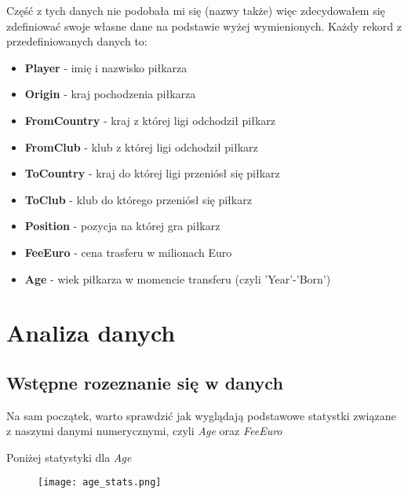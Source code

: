 \documentclass{article}
\begin{document}
Część z tych danych nie podobała mi się (nazwy także) więc zdecydowałem się zdefiniować swoje własne dane na podstawie wyżej wymienionych. Każdy rekord z przedefiniowanych danych to:
\begin{itemize}
    \item \textbf{Player} - imię i nazwisko piłkarza
    \item \textbf{Origin} - kraj pochodzenia piłkarza
    \item \textbf{From\textunderscore Country} - kraj z której ligi odchodził piłkarz
    \item \textbf{From\textunderscore Club} - klub z której ligi odchodził piłkarz
    \item \textbf{To\textunderscore Country} - kraj do której ligi przeniósł się piłkarz
    \item \textbf{To\textunderscore Club} - klub do którego przeniósł się piłkarz
    \item \textbf{Position} - pozycja na której gra piłkarz
    \item \textbf{Fee\textunderscore Euro} - cena trasferu w milionach Euro
    \item \textbf{Age} - wiek piłkarza w momencie transferu (czyli 'Year'-'Born')
\end{itemize}

\section{Analiza danych}
\subsection{Wstępne rozeznanie się w danych}
Na sam początek, warto sprawdzić jak wyglądają podstawowe statystki związane z naszymi danymi numerycznymi, czyli \textit{Age} oraz \textit{Fee\textunderscore Euro}

Poniżej statystyki dla \textit{Age}

\begin{figure}[H]
    \centering
    \texttt{[image: age\_stats.png]}
\end{figure}
\end{document}
